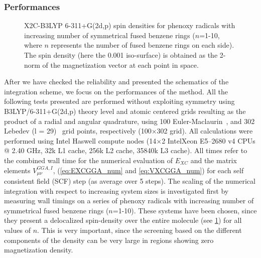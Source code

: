 \subsubsection{Performances}
\begin{figure}
\begin{center}
\end{center}
\caption{X2C-B3LYP 6-311+G(2d,p) spin densities for phenoxy radicals with increasing number of symmetrical fused benzene rings ($n$=1-10, where $n$ represents the number of fused benzene rings on each side). The spin density (here the 0.001 iso-surface) is obtained as the 2-norm of the magnetization vector at each point in space.}
\label{fig:radicals}       
\end{figure}
After we have checked the reliability and presented the schematics of the integration scheme, 
we focus on the performances of the method.
All the following tests presented are performed without exploiting symmetry using B3LYP/6-311+G(2d,p) theory level
and atomic centered grids resulting as the product of a radial and angular
quadrature, using 100 Euler-Maclaurin~\cite{Laming93_997}, and 302 Lebedev (l = 29)~\cite{Lebedev77_99} grid points, respectively (100$\times$302 grid).
All calculations were performed using Intel Haswell compute nodes (14$\times$2 Intel\textregistered Xeon E5--2680 v4 CPUs @ 2.40 GHz, 32k L1 cache, 256k L2 cache, 35840k L3 cache).
All times refer to the combined wall time for 
the numerical evaluation of $E_{XC}$ and the matrix elements  $V^{GGA,I}_{\mu\nu}$, (\cref{eq:EXCGGA_num} and \cref{eq:VXCGGA_num}) for
each  self consistent field (SCF) step (as average over 5 steps).
The scaling of the numerical integration
with respect to increasing system sizes is investigated first by measuring wall timings on a series of phenoxy radicals with increasing number of symmetrical fused benzene rings ($n$=1-10). 
These systems have been chosen, since they present a delocalized spin-density over the entire molecule (see \cref{fig:radicals}) for all values of $n$. This is very important, since the screening based on the different components of the density can be very large in regions showing zero magnetization density.

